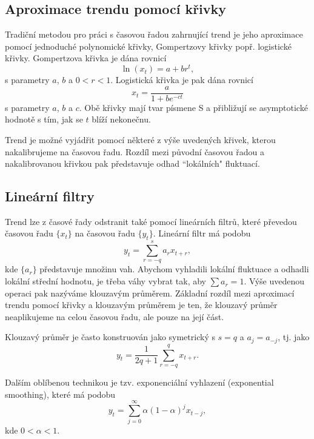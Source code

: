 \subsection{Aproximace trendu pomocí křivky}

Tradiční metodou pro práci s časovou řadou zahrnující trend je jeho aproximace pomocí jednoduché polynomické křivky, Gompertzovy křivky popř. logistické křivky. Gompertzova křivka je dána rovnicí
\begin{equation}
\ln(x_t) = a + b r^t,
\end{equation}
s parametry $a$, $b$ a $0 < r < 1$. Logistická křivka je pak dána rovnicí
\begin{equation}
x_t = \frac{a}{1 + b e^{-ct}}
\end{equation}
s parametry $a$, $b$ a $c$. Obě křivky mají tvar písmene S a přibližují se asymptotické hodnotě s tím, jak se $t$ blíží nekonečnu.

Trend je možné vyjádřit pomocí některé z výše uvedených křivek, kterou nakalibrujeme na časovou řadu. Rozdíl mezi původní časovou řadou a nakalibrovanou křivkou pak představuje odhad ``lokálních" fluktuací.

\subsection{Lineární filtry}

Trend lze z časové řady odstranit také pomocí lineárních filtrů, které převedou časovou řadu $\{x_t\}$ na časovou řadu $\{y_t\}$. Lineární filtr má podobu
\begin{equation}
y_t = \sum_{r = -q}^s a_r x_{t + r},
\end{equation}
kde $\{a_r\}$ představuje množinu vah. Abychom vyhladili lokální fluktuace a odhadli lokální střední hodnotu, je třeba váhy vybrat tak, aby $\sum a_r = 1$. Výše uvedenou operaci pak nazýváme klouzavým průměrem. Základní rozdíl mezi aproximací trendu pomocí křivky a klouzavým průměrem je ten, že klouzavý průměr neaplikujeme na celou časovou řadu, ale pouze na její část.

Klouzavý průměr je často konstruován jako symetrický s $s = q$ a $a_j = a_{-j}$, tj. jako
\begin{equation}
y_t = \frac{1}{2q + 1}\sum_{r = -q}^q x_{t + r}.
\end{equation}

Dalším oblíbenou technikou je tzv. exponenciální vyhlazení (exponential smoothing), které má podobu
\begin{equation}
y_t = \sum_{j = 0}^{\infty} \alpha (1 - \alpha) ^j x_{t - j},
\end{equation}
kde $0 < \alpha < 1$.

